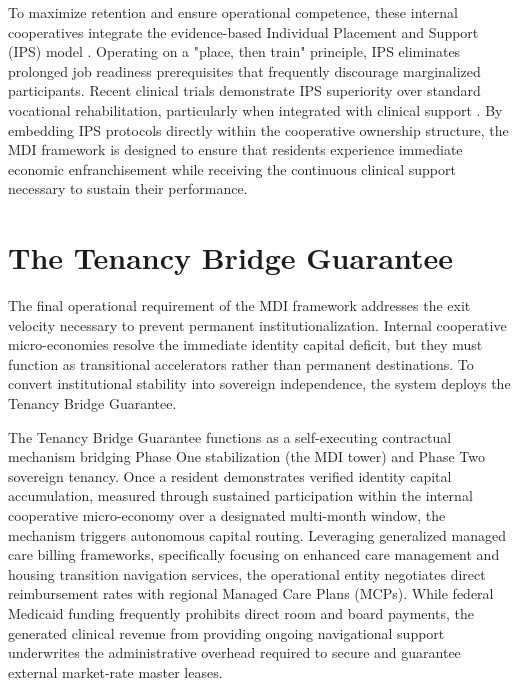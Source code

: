 \documentclass[12pt, letterpaper]{article}
\begin{document}
To maximize retention and ensure operational competence, these internal cooperatives integrate the evidence-based Individual Placement and Support (IPS) model \cite{drake2012individual}. Operating on a "place, then train" principle, IPS eliminates prolonged job readiness prerequisites that frequently discourage marginalized participants. Recent clinical trials demonstrate IPS superiority over standard vocational rehabilitation, particularly when integrated with clinical support \cite{oconnell2021randomized}. By embedding IPS protocols directly within the cooperative ownership structure, the MDI framework is designed to ensure that residents experience immediate economic enfranchisement while receiving the continuous clinical support necessary to sustain their performance.

\section{The Tenancy Bridge Guarantee}

The final operational requirement of the MDI framework addresses the exit velocity necessary to prevent permanent institutionalization. Internal cooperative micro-economies resolve the immediate identity capital deficit, but they must function as transitional accelerators rather than permanent destinations. To convert institutional stability into sovereign independence, the system deploys the Tenancy Bridge Guarantee.

The Tenancy Bridge Guarantee functions as a self-executing contractual mechanism bridging Phase One stabilization (the MDI tower) and Phase Two sovereign tenancy. Once a resident demonstrates verified identity capital accumulation, measured through sustained participation within the internal cooperative micro-economy over a designated multi-month window, the mechanism triggers autonomous capital routing. Leveraging generalized managed care billing frameworks, specifically focusing on enhanced care management and housing transition navigation services, the operational entity negotiates direct reimbursement rates with regional Managed Care Plans (MCPs). While federal Medicaid funding frequently prohibits direct room and board payments, the generated clinical revenue from providing ongoing navigational support underwrites the administrative overhead required to secure and guarantee external market-rate master leases.
\end{document}
